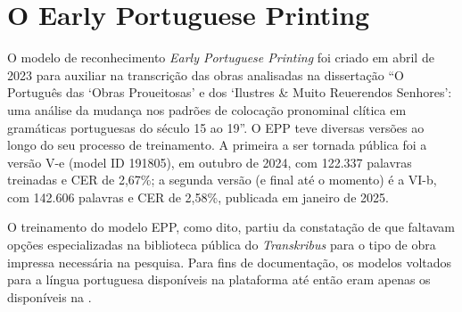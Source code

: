 \documentclass[portuguese]{textolivre}
\begin{document}
\section{O Early Portuguese Printing}
O modelo de reconhecimento \textit{Early Portuguese Printing} foi criado em abril de 2023 para auxiliar na transcrição das obras analisadas na dissertação “O Português das ‘Obras Proueitosas’ e dos ‘Ilustres \& Muito Reuerendos Senhores’: uma análise da mudança nos padrões de colocação pronominal clítica em gramáticas portuguesas do século 15 ao 19”. O EPP teve diversas versões ao longo do seu processo de treinamento. A primeira a ser tornada pública foi a versão V-e (model ID 191805), em outubro de 2024, com 122.337 palavras treinadas e CER de 2,67\%; a segunda versão (e final até o momento) é a VI-b, com 142.606 palavras e CER de 2,58\%, publicada em janeiro de 2025.

O treinamento do modelo EPP, como dito, partiu da constatação de que faltavam opções especializadas na biblioteca pública do \textit{Transkribus} para o tipo de obra impressa necessária na pesquisa. Para fins de documentação, os modelos voltados para a língua portuguesa disponíveis na plataforma até então eram apenas os disponíveis na .
\end{document}
